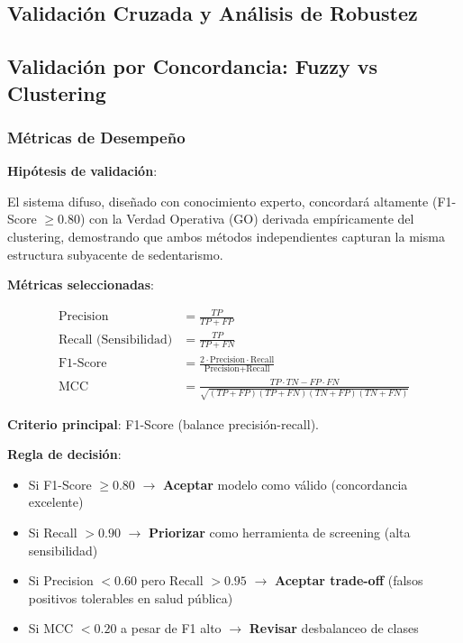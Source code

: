 \documentclass[12pt,letterpaper,twoside]{report}
\begin{document}
\begin{calculobox}
\chapter{Validación Cruzada y Análisis de Robustez}

\section{Validación por Concordancia: Fuzzy vs Clustering}

\subsection{Métricas de Desempeño}

\begin{hipotesisbox}
\textbf{Hipótesis de validación}:

El sistema difuso, diseñado con conocimiento experto, concordará altamente (F1-Score $\geq 0.80$) con la Verdad Operativa (GO) derivada empíricamente del clustering, demostrando que ambos métodos independientes capturan la misma estructura subyacente de sedentarismo.
\end{hipotesisbox}

\begin{estadisticobox}
\textbf{Métricas seleccionadas}:

\begin{align}
\text{Precision} &= \frac{TP}{TP + FP} \\
\text{Recall (Sensibilidad)} &= \frac{TP}{TP + FN} \\
\text{F1-Score} &= \frac{2 \cdot \text{Precision} \cdot \text{Recall}}{\text{Precision} + \text{Recall}} \\
\text{MCC} &= \frac{TP \cdot TN - FP \cdot FN}{\sqrt{(TP+FP)(TP+FN)(TN+FP)(TN+FN)}}
\end{align}

\textbf{Criterio principal}: F1-Score (balance precisión-recall).
\end{estadisticobox}

\begin{reglabox}
\textbf{Regla de decisión}:

\begin{itemize}[noitemsep]
    \item Si F1-Score $\geq 0.80$ $\to$ \textbf{Aceptar} modelo como válido (concordancia excelente)
    \item Si Recall $> 0.90$ $\to$ \textbf{Priorizar} como herramienta de screening (alta sensibilidad)
    \item Si Precision $< 0.60$ pero Recall $> 0.95$ $\to$ \textbf{Aceptar trade-off} (falsos positivos tolerables en salud pública)
    \item Si MCC $< 0.20$ a pesar de F1 alto $\to$ \textbf{Revisar} desbalanceo de clases
\end{itemize}
\end{reglabox}


\end{calculobox}
\end{document}
